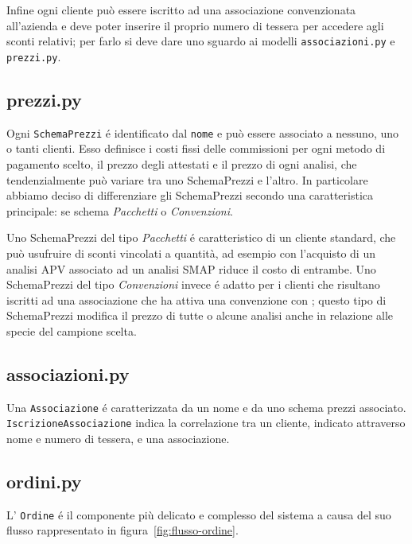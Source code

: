 Infine ogni cliente può essere iscritto ad una associazione convenzionata all'azienda {\fem} e deve poter inserire il proprio numero di tessera per accedere agli sconti relativi; per farlo si deve dare uno sguardo ai modelli \texttt{associazioni.py} e \texttt{prezzi.py}.

\subsection*{prezzi.py}
\label{subs:prezzi}
Ogni \texttt{SchemaPrezzi} é identificato dal \texttt{nome} e può essere associato a nessuno, uno o tanti clienti. Esso definisce i costi fissi delle commissioni per ogni metodo di pagamento scelto, il prezzo degli attestati e il prezzo di ogni analisi, che tendenzialmente può variare tra uno SchemaPrezzi e l'altro.
In particolare abbiamo deciso di differenziare gli SchemaPrezzi secondo una caratteristica principale: se schema \emph{Pacchetti} o \emph{Convenzioni}.

Uno SchemaPrezzi del tipo \emph{Pacchetti} é caratteristico di un cliente standard, che può usufruire di sconti vincolati a quantità, ad esempio con l'acquisto di un analisi APV associato ad un analisi SMAP riduce il costo di entrambe. Uno SchemaPrezzi del tipo \emph{Convenzioni} invece é adatto per i clienti che risultano iscritti ad una associazione che ha attiva una convenzione con {\fem}; questo tipo di SchemaPrezzi modifica il prezzo di tutte o alcune analisi anche in relazione alle specie del campione scelta.

\subsection*{associazioni.py}
\label{subs:associazioni}
Una \texttt{Associazione} é caratterizzata da un nome e da uno schema prezzi associato. \texttt{IscrizioneAssociazione} indica la correlazione tra un cliente, indicato attraverso nome e numero di tessera, e una associazione.

\subsection*{ordini.py}
\label{subs:ordini}
L' \texttt{Ordine} é il componente più delicato e complesso del sistema a causa del suo flusso rappresentato in figura~\ref{fig:flusso-ordine}.


